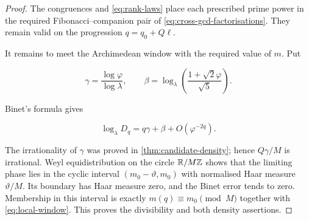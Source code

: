 \begin{proof}
The congruences and \cref{eq:rank-laws} place each prescribed prime power in
the required Fibonacci--companion pair of
\cref{eq:cross-gcd-factorisations}. They remain valid on the progression
$q=q_0+Q\ell$.

It remains to meet the Archimedean window with the required value of $m$.
Put

\begin{equation}
 \gamma=\frac{\log\varphi}{\log\lambda},
 \qquad
 \beta=\log_\lambda\left(\frac{1+\sqrt2\varphi}{\sqrt5}\right).
\end{equation}

Binet's formula gives

\begin{equation}
 \log_\lambda D_q=q\gamma+\beta+O(\varphi^{-2q}).
 \label{eq:local-rotation}
\end{equation}

The irrationality of $\gamma$ was proved in
\cref{thm:candidate-density}; hence $Q\gamma/M$ is irrational. Weyl
equidistribution on the circle $\mathbb{R}/M\mathbb{Z}$ shows that the limiting phase lies
in the cyclic interval $(m_0-\vartheta,m_0)$ with normalised Haar measure
$\vartheta/M$. Its boundary has Haar measure zero, and the Binet error tends
to zero. Membership in this interval is exactly
$m(q)\equiv m_0\pmod M$ together with \cref{eq:local-window}. This proves
the divisibility and both density assertions.
\end{proof}

